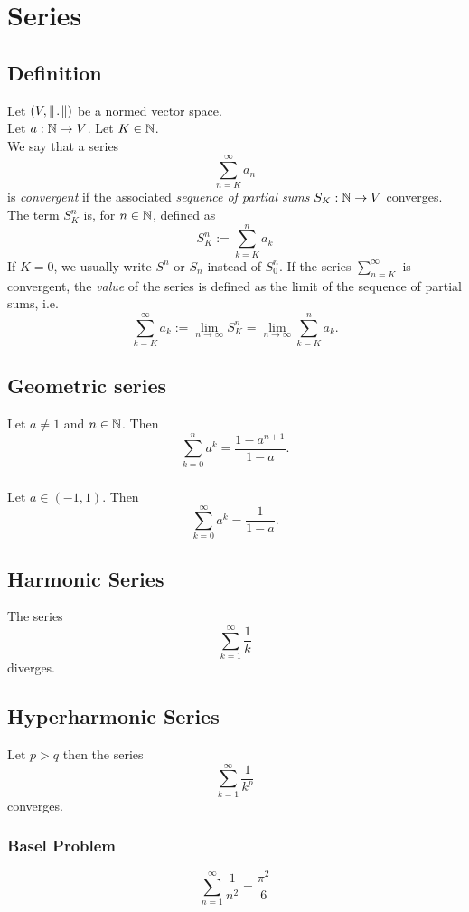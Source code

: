 \section{Series}

\subsection{Definition}
\udef Let $(V, \norm)$ be a normed vector space.\\
Let $a : \mathbb{N} \to V$. Let $K \in \mathbb{N}$.\\
We say that a series
\[
    \sum_{n=K}^{\infty} a_n
\]
is \emph{convergent} if the associated \emph{sequence of partial sums}
$S_K : \mathbb{N} \to V$ converges.
The term $S_K^n$ is, for $n \in \mathbb{N}$, defined as
\[
    S_K^n := \sum_{k=K}^{n} a_k
\]
If $K = 0$, we usually write $S^n$ or $S_n$ instead of $S_0^n$.
If the series $\sum_{n=K}^{\infty}$ is convergent, the \emph{value} of the series
is defined as the limit of the sequence of partial sums, i.e.
\[
    \sum_{k=K}^{\infty} a_k := \lim_{n \to \infty} S_K^n
        = \lim_{n \to \infty} \sum_{k=K}^{n} a_k.
\]

\subsection{Geometric series}
\uprop Let $a \neq 1$ and $n \in \mathbb{N}$. Then
\[
    \sum_{k=0}^{n} a^k = \frac{1 - a^{n+1}}{1 - a}.
\]

\subsubsection*{}
\uprop Let $a \in (-1, 1)$. Then
\[
    \sum_{k=0}^{\infty} a^k = \frac{1}{1-a}.
\]

\subsection{Harmonic Series}
\uprop The series
\[
    \sum_{k=1}^{\infty} \frac{1}{k}
\]
diverges.

\subsection{Hyperharmonic Series}
\uprop Let $p > q$ then the series
\[
    \sum_{k=1}^{\infty} \frac{1}{k^p}
\]
converges.

\subsubsection*{Basel Problem}
\uthm
\[
    \sum_{n=1}^{\infty} \frac{1}{n^2} = \frac{\pi^2}{6}
\]


